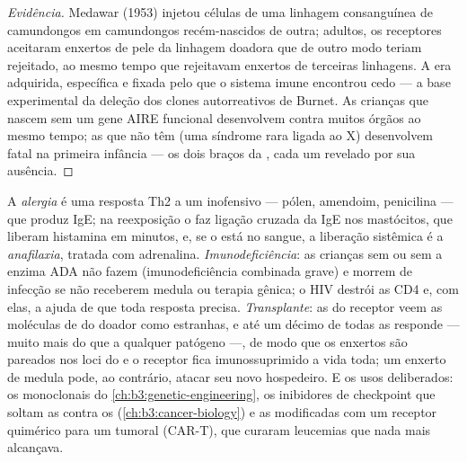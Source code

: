 \begin{proof}[Evidência]
Medawar (1953) injetou células de uma linhagem consanguínea de
camundongos em camundongos recém-nascidos de outra; adultos, os
receptores aceitaram enxertos de pele da linhagem doadora que de outro
modo teriam rejeitado, ao mesmo tempo que rejeitavam enxertos de
terceiras linhagens. A  era adquirida, específica e fixada
pelo que o sistema imune encontrou cedo --- a base experimental da
deleção dos clones autorreativos de Burnet. As crianças que nascem sem
um gene AIRE funcional desenvolvem  contra muitos órgãos ao
mesmo tempo; as que não têm  (uma síndrome rara ligada ao X)
desenvolvem  fatal na primeira infância --- os dois braços
da , cada um revelado por sua ausência.
\end{proof}

\begin{example}\label{ex:b3:adaptive-immunity:failures}
A \emph{alergia} é uma resposta Th2 a um  inofensivo --- pólen,
amendoim, penicilina --- que produz IgE; na reexposição o  faz
ligação cruzada da IgE nos mastócitos, que liberam histamina em minutos,
e, se o  está no sangue, a liberação sistêmica é a
\emph{anafilaxia}, tratada com adrenalina. \emph{Imunodeficiência}: as
crianças sem  ou sem a enzima ADA não fazem 
(imunodeficiência combinada grave) e morrem de infecção se não
receberem medula ou terapia gênica; o HIV destrói as  CD4 e,
com elas, a ajuda de que toda resposta precisa. \emph{Transplante}: as
 do receptor veem as moléculas de  do doador como estranhas,
e até um décimo de todas as  responde --- muito mais do que a
qualquer patógeno ---, de modo que os enxertos são pareados nos loci do
 e o receptor fica imunossuprimido a vida toda; um enxerto de medula
pode, ao contrário, atacar seu novo hospedeiro. E os usos deliberados:
os  monoclonais do \cref{ch:b3:genetic-engineering}, os
inibidores de checkpoint que soltam as  contra os 
(\cref{ch:b3:cancer-biology}) e as  modificadas com um receptor
quimérico para um  tumoral (CAR-T), que curaram leucemias que
nada mais alcançava.
\end{example}

